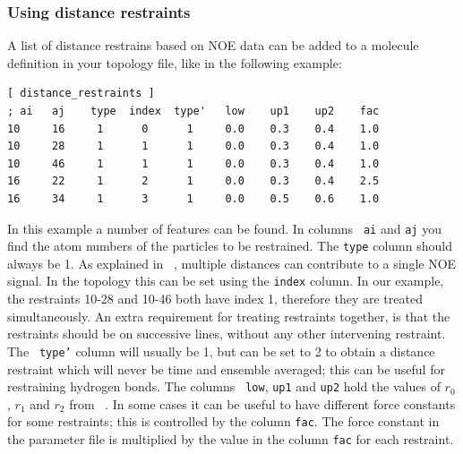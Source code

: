 \subsubsection{Using distance restraints}

A list of distance restrains based on NOE data can be added to a molecule
definition in your topology file, like in the following example:
\begin{verbatim}
[ distance_restraints ]
; ai   aj    type  index  type'   low    up1    up2    fac
10     16     1      0      1     0.0    0.3    0.4    1.0 
10     28     1      1      1     0.0    0.3    0.4    1.0 
10     46     1      1      1     0.0    0.3    0.4    1.0 
16     22     1      2      1     0.0    0.3    0.4    2.5 
16     34     1      3      1     0.0    0.5    0.6    1.0 
\end{verbatim}
In this example a number of features can be found.  In columns {\tt
ai} and {\tt aj} you find the atom numbers of the particles to be
restrained. The {\tt type} column should always be 1.  As explained in
~, multiple distances can contribute to a single NOE
signal. In the topology this can be set using the {\tt index}
column. In our example, the restraints 10-28 and 10-46 both have index
1, therefore they are treated simultaneously.  An extra requirement
for treating restraints together, is that the restraints should be on
successive lines, without any other intervening restraint.  The {\tt
type'} column will usually be 1, but can be set to 2 to obtain a
distance restraint which will never be time and ensemble averaged;
this can be useful for restraining hydrogen bonds.  The columns {\tt
low}, {\tt up1} and {\tt up2} hold the values of $r_0$, $r_1$ and
$r_2$ from ~.  In some cases it can be useful to have
different force constants for some restraints; this is controlled by
the column {\tt fac}.  The force constant in the parameter file is
multiplied by the value in the column {\tt fac} for each restraint.

